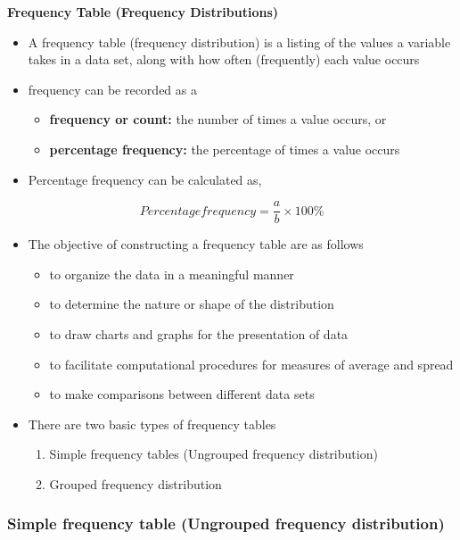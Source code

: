 \documentclass[]{book}
\providecommand{\tightlist}{%
  \setlength{\itemsep}{0pt}\setlength{\parskip}{0pt}}
\begin{document}
\textbf{Frequency Table (Frequency Distributions)}

\begin{itemize}
\tightlist
\item
  A frequency table (frequency distribution) is a listing of the values a variable takes in a data set, along with how often (frequently) each value occurs
\item
  frequency can be recorded as a

  \begin{itemize}
  \tightlist
  \item
    \textbf{frequency or count:} the number of times a value occurs, or
  \item
    \textbf{percentage frequency:} the percentage of times a value occurs
  \end{itemize}
\item
  Percentage frequency can be calculated as,
\end{itemize}

\[Percentage frequency = \frac{a}{b} \times100 \%\]

\begin{itemize}
\tightlist
\item
  The objective of constructing a frequency table are as follows

  \begin{itemize}
  \tightlist
  \item
    to organize the data in a meaningful manner
  \item
    to determine the nature or shape of the distribution
  \item
    to draw charts and graphs for the presentation of data
  \item
    to facilitate computational procedures for measures of average and spread
  \item
    to make comparisons between different data sets
  \end{itemize}
\item
  There are two basic types of frequency tables

  \begin{enumerate}
  \def\labelenumi{\arabic{enumi}.}
  \tightlist
  \item
    Simple frequency tables (Ungrouped frequency distribution)
  \item
    Grouped frequency distribution
  \end{enumerate}
\end{itemize}

\hypertarget{simple-frequency-table-ungrouped-frequency-distribution}{%
\subsubsection{Simple frequency table (Ungrouped frequency distribution)}\label{simple-frequency-table-ungrouped-frequency-distribution}}
\end{document}
